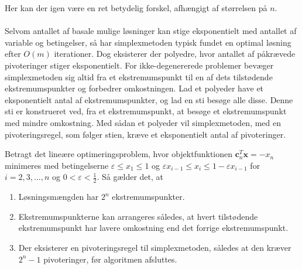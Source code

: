 Her kan der igen være en ret betydelig forskel, afhængigt af størrelsen på $n$.\\\\
%
Selvom antallet af basale mulige løsninger kan stige eksponentielt med antallet af variable og betingelser, så har simplexmetoden typisk fundet en optimal løsning efter $O(m)$ iterationer.
Dog eksisterer der polyedre, hvor antallet af påkrævede pivoteringer stiger eksponentielt.
For ikke-degenererede problemer bevæger simplexmetoden sig altid fra et ekstremumspunkt til en af dets tilstødende ekstremumspunkter og forbedrer omkostningen.
Lad et polyeder have et eksponentielt antal af ekstremumspunkter, og lad en sti besøge alle disse.
Denne sti er konstrueret ved, fra et ekstremumspunkt, at besøge et ekstremumspunkt med mindre omkostning.
Med sådan et polyeder vil simplexmetoden, med en pivoteringsregel, som følger stien, kræve et eksponentielt antal af pivoteringer.
\begin{thm}{}{}
Betragt det lineære optimeringsproblem, hvor objektfunktionen $\textbf{c}_n^T \textbf{x} = -x_n$ minimeres med betingelserne $\varepsilon \leq x_1 \leq 1$ og $\varepsilon x_{i-1} \leq x_i \leq 1 - \varepsilon x_{i-1}$ for $i = 2, 3, \ldots, n$ og $0 < \varepsilon < \frac{1}{2}$.
Så gælder det, at
%
\begin{enumerate}[label=(\alph*)]
\item Løsningsmængden har $2^n$ ekstremumspunkter.
\item Ekstremumspunkterne kan arrangeres således, at hvert tilstødende ekstremumspunkt har lavere omkostning end det forrige ekstremumspunkt.
\item Der eksisterer en pivoteringsregel til simplexmetoden, således at den kræver $2^n-1$ pivoteringer, før algoritmen afsluttes.
\end{enumerate}
%
\end{thm}
%
